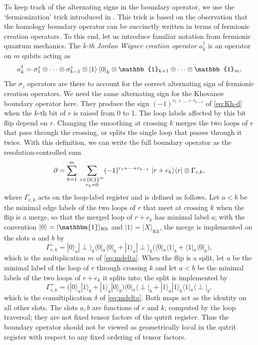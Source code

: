 \documentclass[a4paper,onecolumn,unpublished]{quantumarticle}
\theoremstyle{plain}
\theoremstyle{definition}
\theoremstyle{definition}
\numberwithin{equation}{section}
\def\1{\mathbbm{1}}%
\newcommand{\tens}{\otimes}
\newcommand{\del}{\partial}
\begin{document}
To keep track of the alternating signs in the boundary operator, we use the `fermionization' trick introduced in \cite{IBMresult}. This trick is based on the observation that the homology boundary operator can be succinctly written in terms of fermionic creation operators. To this end, let us introduce familiar notation from fermionic quantum mechanics. The \emph{k-th Jordan Wigner creation operator} $a_k^\dagger$ is an operator on $m$ qubits acting as \begin{equation}
a_k^\dagger = \sigma^z_1 \tens \dots \tens \sigma^z_{k-1} \tens \ket{1}\bra{0}_k \tens \mathbb{1}_{k+1} \tens \dots \tens \mathbb{1}_m.
\end{equation} The $\sigma_z$ operators are there to account for the correct alternating sign of fermionic creation operators. We need the same alternating sign for the Khovanov boundary operator here. They produce the sign $(-1)^{r_1+\dots+r_{k-1}}$ of \cref{eq:Kh-d} when the $k$-th bit of $r$ is raised from $0$ to $1$. The loop labels affected by this bit flip depend on $r$. Changing the smoothing at crossing $k$ merges the two loops of $r$ that pass through the crossing, or splits the single loop that passes through it twice. With this definition, we can write the full boundary operator as the resolution-controlled sum
\begin{equation}\label{eq:d-controlled}
    \del = \sum_{k=1}^m \;\sum_{\substack{r\in\{0,1\}^m\\ r_k=0}} (-1)^{r_1+\dots+r_{k-1}}\,\ket{r+e_k}\!\bra{r}\otimes \Gamma_{r,k},
\end{equation}
where $\Gamma_{r,k}$ acts on the loop-label register and is defined as follows.  Let $a<b$ be the minimal edge labels of the two loops of $r$ that meet at crossing $k$ when the flip is a merge, so that the merged loop of $r+e_k$ has minimal label $a$; with the convention $|0\rangle=|\1\rangle_{\mathrm{Kh}}$ and $|1\rangle=|X\rangle_{\mathrm{Kh}}$, the merge is implemented on the slots $a$ and $b$ by
\begin{equation}\label{eq:Gamma-merge}
\Gamma^{-}_{r,k}
=
|0\rangle_a|\perp\rangle_b
  \langle 0|_a\langle 0|_b
+
|1\rangle_a|\perp\rangle_b
  \bigl(\langle 0|_a\langle 1|_b
        +\langle 1|_a\langle 0|_b\bigr),
\end{equation}
which is the multiplication $m$ of \cref{eq:mdelta}.  When the flip is a split, let $a$ be the minimal label of the loop of $r$ through crossing $k$ and let $a<b$ be the minimal labels of the two loops of $r+e_k$ it splits into; the split is implemented by
\begin{equation}\label{eq:Gamma-split}
\Gamma^{+}_{r,k}
=
\bigl(|0\rangle_a|1\rangle_b+|1\rangle_a|0\rangle_b\bigr)
  \langle 0|_a\langle \perp|_b
+
|1\rangle_a|1\rangle_b
  \langle 1|_a\langle \perp|_b ,
\end{equation}
which is the comultiplication $\delta$ of \cref{eq:mdelta}.  Both maps act as the identity on all other slots.  The slots $a,b$ are functions of $r$ and $k$, computed by the loop traversal; they are not fixed tensor factors of the qutrit register.  Thus the boundary operator should not be viewed as
geometrically local in the qutrit register with respect to any fixed
ordering of tensor factors.
\end{document}
